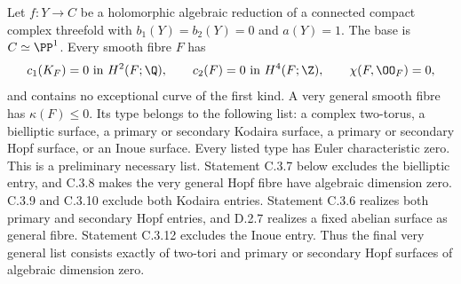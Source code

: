 \begin{proposition}[C.3.1; Proved]\label{st:C.3.1}
Let $f:Y\to C$ be a holomorphic algebraic reduction of a connected
compact complex threefold with $b_1(Y)=b_2(Y)=0$ and $a(Y)=1$.
The base is $C\simeq\PP^1$. Every smooth fibre $F$ has
\[
 c_1(K_F)=0\text{ in }H^2(F;\Q),\qquad
 c_2(F)=0\text{ in }H^4(F;\Z),\qquad
 \chi(F,\OO_F)=0,
\]
and contains no exceptional curve of the first kind. A very general
smooth fibre has $\kappa(F)\leq0$. Its type belongs to the following
list: a complex two-torus, a bielliptic surface, a primary or secondary
Kodaira surface, a primary or secondary Hopf surface, or an Inoue
surface. Every listed type has Euler characteristic zero. This is a
preliminary necessary list. Statement C.3.7 below excludes the
bielliptic entry, and C.3.8 makes the very general Hopf fibre have
algebraic dimension zero. C.3.9 and C.3.10 exclude both Kodaira
entries. Statement C.3.6 realizes both primary and secondary Hopf
entries, and D.2.7 realizes a fixed abelian surface as general
fibre. Statement C.3.12 excludes the Inoue entry. Thus the
final very general list consists exactly of two-tori and
primary or secondary Hopf surfaces of algebraic dimension zero.
\end{proposition}
